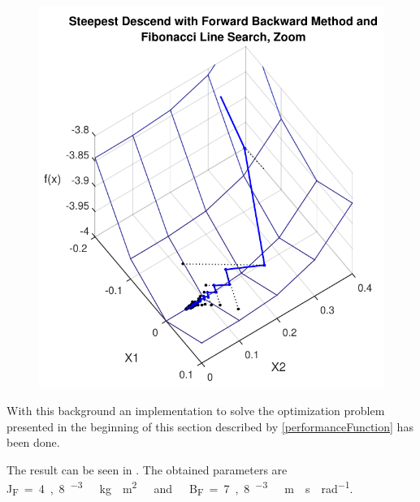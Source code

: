 \begin{minipage}{\linewidth}
\begin{minipage}{0.45\linewidth}
\begin{figure}[H]
			\includegraphics[scale=.62]{figures/gradientForwardBackwardAndFibonacciZoom}
			\centering
			\captionsetup{justification=centering}
			\label{gradientForwardBackwardAndFibonacciZoom}
		\end{figure}
	\end{minipage}
\end{minipage}

With this background an implementation to solve the optimization problem presented in the beginning of this section described by \eqref{performanceFunction} has been done.

The result can be seen in . The obtained parameters are \si{J_F=4,8 ^{-3}\ kg \cdot m^2\ and\ B_F=7,8 ^{-3}\ m \cdot s \cdot rad^{-1}}.

